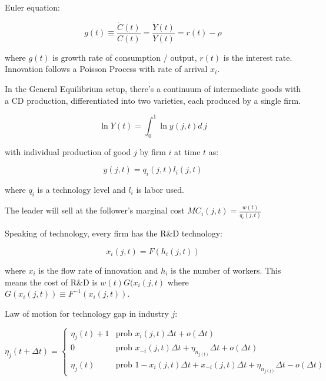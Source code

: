 \documentclass[11pt]{article}
\begin{document}
  Euler equation:

  \begin{equation}
    g(t) \equiv \frac{\dot{C}(t)}{C(t)} = \frac{\dot{Y}(t)}{Y(t)} = r(t) - \rho
  \end{equation}

  where $g(t)$ is growth rate of consumption / output, $r(t)$ is the interest rate.
  Innovation follows a Poisson Process with rate of arrival $x_i$.

  In the General Equilibrium setup, there's a continuum of intermediate goods with a CD production, differentiated into two varieties, each produced by a single firm.

  \begin{equation} \label{eq:tech_output}
    \ln Y(t) = \int_{0}^{1} \ln y(j, t) d\,j 
  \end{equation}

  with individual production of good $j$ by firm $i$ at time $t$ as:

  \begin{equation}
    y(j, t) = q_i(j, t)l_i(j, t)
  \end{equation}

  where $q_i$ is a technology level and $l_i$ is labor used.

  The leader will sell at the follower's marginal cost $MC_i(j, t) = \frac{w(t)}{q_i(j, t)}$

  Speaking of technology, every firm has the R\&D technology:

  \begin{equation} \label{eq:tech_rd_technology}
    x_i(j, t) = F(h_i(j, t))
  \end{equation}

  where $x_i$ is the flow rate of innovation and $h_i$ is the number of workers.  This means the cost of R\&D is $w(t)G(x_i(j,t)$ where $G(x_i(j,t)) \equiv F^{-1}(x_i(j,t))$.

  Law of motion for technology gap in industry $j$:

  \begin{equation} \label{eq:tech_law_of_motion}
    \eta_j(t + \Delta t) =
    \begin{cases}
      \eta_j(t) + 1 & \textrm{prob } x_i(j,t)\Delta t + o(\Delta t)\\
      0 & \textrm{prob } x_{-i}(j,t)\Delta t + \eta_{n_{j(t)}}\Delta t + o(\Delta t) \\
      \eta_j(t) & \textrm{prob } 1 - x_i(j,t)\Delta t + x_{-i}(j,t)\Delta t + \eta_{n_{j(t)}}\Delta t - o(\Delta t)
    \end{cases}
  \end{equation}
\end{document}
